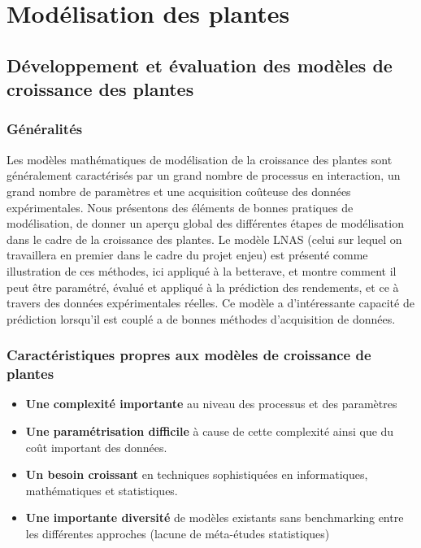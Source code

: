 \section{Modélisation des plantes}
\label{ann:caractéristique}

\subsection{Développement et évaluation des modèles de croissance des plantes}

\subsubsection{Généralités}

Les modèles mathématiques de modélisation de la croissance des plantes sont généralement caractérisés par un grand nombre de processus en interaction,  un grand nombre de paramètres et une acquisition coûteuse des données expérimentales. 
Nous présentons des éléments de bonnes pratiques de modélisation, de donner un aperçu global des différentes étapes de modélisation dans le cadre de la croissance des plantes.
Le modèle LNAS (celui sur lequel on travaillera en premier dans le cadre du projet enjeu) est présenté comme illustration de ces méthodes, ici appliqué à la betterave, et montre comment il peut être paramétré, évalué et appliqué à la prédiction des rendements, et ce à travers des données expérimentales réelles. Ce modèle a d’intéressante capacité de prédiction lorsqu’il est couplé a de bonnes méthodes d’acquisition de données.

\subsubsection{Caractéristiques propres aux modèles de croissance de plantes}

\begin{itemize}

\item \textbf{Une complexité importante} au niveau des processus et des paramètres
\item \textbf{Une paramétrisation difficile} à cause de cette complexité ainsi que du coût important des données.
\item \textbf{Un besoin croissant} en techniques sophistiquées en informatiques, mathématiques et statistiques.
\item \textbf{Une importante diversité} de modèles existants sans benchmarking entre les différentes approches (lacune de méta-études statistiques)

\end{itemize}

